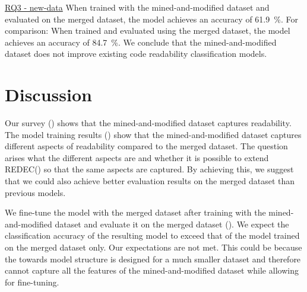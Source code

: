 \documentclass[%
class=scrreprt,
chapterprefix=false,%
open=right,%
twoside=false,%
paper=a4,%
logofile={Logo\_zentral\_farbig\_EN.png},%
thesistype=master,%
UKenglish,%
]{se2thesis}
\theoremstyle{definition}
\newcommand{\rdh}{REDEC\xspace}
\begin{document}
	\begin{summary}{\hyperref[new-data]{RQ3 - new-data}}
		When trained with the mined-and-modified dataset and evaluated on the merged dataset, the model achieves an accuracy of 61.9~\%. For comparison: When trained and evaluated using the merged dataset, the model achieves an accuracy of 84.7~\%.
		We conclude that the mined-and-modified dataset does not improve existing code readability classification models.
	\end{summary}
	
	
\section{Discussion} \label{Discussion}

	Our survey () shows that the mined-and-modified dataset captures readability. The model training results () show that the mined-and-modified dataset captures different aspects of readability compared to the merged dataset. 	
	The question arises what the different aspects are and whether it is possible to extend \rdh () so that the same aspects are captured. By achieving this, we suggest that we could also achieve better evaluation results on the merged dataset than previous models.
	
	We fine-tune the model with the merged dataset after training with the mined-and-modified dataset and evaluate it on the merged dataset (). We expect the classification accuracy of the resulting model to exceed that of the model trained on the merged dataset only.
	Our expectations are not met. This could be because the towards model structure is designed for a much smaller dataset and therefore cannot capture all the features of the mined-and-modified dataset while allowing for fine-tuning.
\end{document}
